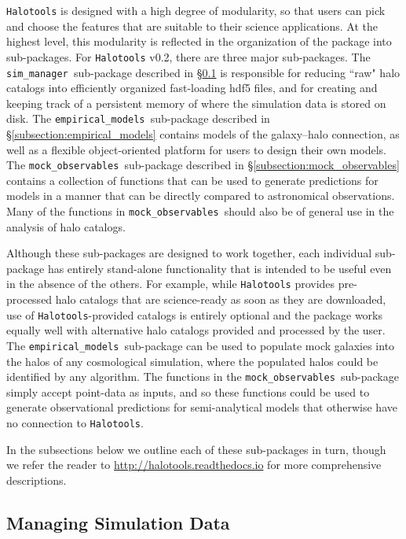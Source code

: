 \documentclass[twocolumn, tighten]{aastex6}
\newcommand{\mockobs}{{\tt mock\_observables }}
\newcommand{\emodels}{{\tt empirical\_models }}
\newcommand{\sims}{{\tt sim\_manager }}
\begin{document}
{\tt Halotools} is designed with a high degree of modularity, so that users can pick and choose the features that are suitable to their science applications. At the highest level, this modularity is reflected in the organization of the package into sub-packages. For {\tt Halotools} v0.2, there are three major sub-packages. The \sims sub-package described in \S\ref{subsection:sim_manager} is responsible for reducing ``raw" halo catalogs into efficiently organized fast-loading hdf5 files, and for creating and keeping track of a persistent memory of where the simulation data is stored on disk. The \emodels sub-package described in \S\ref{subsection:empirical_models} contains models of the galaxy--halo connection, as well as a flexible object-oriented platform for users to design their own models. The \mockobs sub-package described in \S\ref{subsection:mock_observables} contains a collection of functions that can be used to generate predictions for models in a manner that can be directly compared to astronomical observations. Many of the functions in \mockobs should also be of general use in the analysis of halo catalogs.

Although these sub-packages are designed to work together, each individual sub-package has entirely stand-alone functionality that is intended to be useful even in the absence of the others. For example, while {\tt Halotools} provides pre-processed halo catalogs that are science-ready as soon as they are downloaded, use of {\tt Halotools}-provided catalogs is entirely optional and the package works equally well with alternative halo catalogs provided and processed by the user. The \emodels sub-package can be used to populate mock galaxies into the halos of any cosmological simulation, where the populated halos could be identified by any algorithm. The functions in the \mockobs sub-package simply accept point-data as inputs, and so these functions could be used to generate observational predictions for semi-analytical models that otherwise have no connection to {\tt Halotools}.

In the subsections below we outline each of these sub-packages in turn, though we refer the reader to \url{http://halotools.readthedocs.io} for more comprehensive descriptions.

\subsection{Managing Simulation Data}
\label{subsection:sim_manager}
\end{document}
